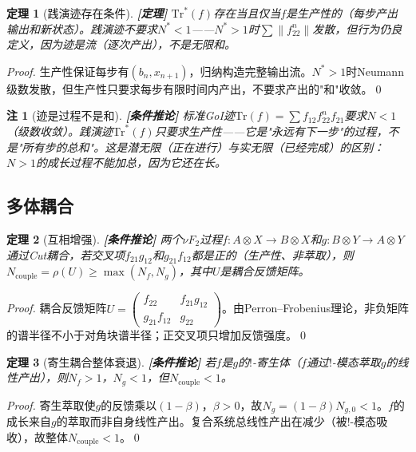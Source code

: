 \documentclass[11pt,a4paper]{article}
\newtheorem{theorem}{定理}
\newtheorem{remark}{注}
\newcommand{\lvl}[1]{\hfill\textbf{\footnotesize[#1]}}
\newcommand{\lvP}{\lvl{定理}}
\newcommand{\lvC}{\lvl{条件推论}}
\newcommand{\bang}{{!}}
\newcommand{\tensor}{\otimes}
\begin{document}
\begin{theorem}[践演迹存在条件]\label{thm:performative-exists}\lvP
$\mathrm{Tr}^*(f)$存在当且仅当$f$是生产性的（每步产出输出和新状态）。践演迹不要求$N^*<1$——$N^*>1$时$\sum\|f_{22}^n\|$发散，但行为仍良定义，因为迹是流（逐次产出），不是无限和。
\end{theorem}

\begin{proof}
生产性保证每步有$(b_n,x_{n+1})$，归纳构造完整输出流。$N^*>1$时Neumann级数发散，但生产性只要求每步有限时间内产出，不要求产出的"和"收敛。\qed
\end{proof}

\begin{remark}[迹是过程不是和]\lvC
标准GoI迹$\mathrm{Tr}(f)=\sum f_{12}f_{22}^nf_{21}$要求$N<1$（级数收敛）。践演迹$\mathrm{Tr}^*(f)$只要求生产性——它是"永远有下一步"的过程，不是"所有步的总和"。这是潜无限（正在进行）与实无限（已经完成）的区别：$N>1$的成长过程不能加总，因为它还在长。
\end{remark}

\subsection{多体耦合}

\begin{theorem}[互相增强]\label{thm:mutual-enhancement}\lvC
两个$\nu F_2$过程$f:A\tensor X\to B\tensor X$和$g:B\tensor Y\to A\tensor Y$通过Cut耦合，若交叉项$f_{21}g_{12}$和$g_{21}f_{12}$都是正的（生产性、非萃取），则$N_{\mathrm{couple}}=\rho(U)\geq\max(N_f,N_g)$，其中$U$是耦合反馈矩阵。
\end{theorem}

\begin{proof}
耦合反馈矩阵$U=\begin{pmatrix}f_{22}&f_{21}g_{12}\\g_{21}f_{12}&g_{22}\end{pmatrix}$。由Perron--Frobenius理论，非负矩阵的谱半径不小于对角块谱半径；正交叉项只增加反馈强度。\qed
\end{proof}

\begin{theorem}[寄生耦合整体衰退]\label{thm:parasitic-coupling}\lvC
若$f$是$g$的$\bang$-寄生体（$f$通过$\bang$-模态萃取$g$的线性产出），则$N_f>1$，$N_g<1$，但$N_{\mathrm{couple}}<1$。
\end{theorem}

\begin{proof}
寄生萃取使$g$的反馈乘以$(1-\beta)$，$\beta>0$，故$N_g=(1-\beta)N_{g,0}<1$。$f$的成长来自$g$的萃取而非自身线性产出。复合系统总线性产出在减少（被$\bang$-模态吸收），故整体$N_{\mathrm{couple}}<1$。\qed
\end{proof}
\end{document}
